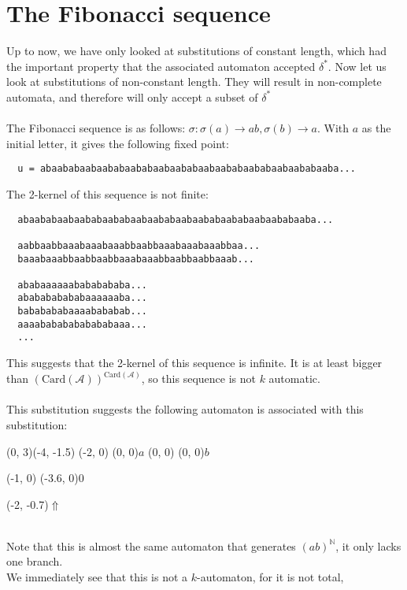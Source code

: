 \documentclass{article}
\begin{document}
\section*{The Fibonacci sequence}
Up to now, we have only looked at substitutions of constant length, which had
the important property that the associated automaton accepted 
$\delta^*$. Now let us look at substitutions of non-constant
length. They will result in non-complete automata, and therefore will only
accept a subset of $\delta^*$\\
\\
The Fibonacci sequence is as follows: $\sigma: \sigma(a) \rightarrow ab, 
\sigma(b) \rightarrow a$. With $a$ as the initial letter, it gives the 
following fixed point:
\begin{verbatim}
  u = abaababaabaababaababaabaababaabaababaababaabaababaaba...
\end{verbatim}
The 2-kernel of this sequence is not finite:
\begin{verbatim}
  abaababaabaababaababaabaababaabaababaababaabaababaaba...

  aabbaabbaaabaaabaaabbaabbaaabaaabaaabbaa...
  baaabaaabbaabbaabbaaabaaabbaabbaabbaaab...

  ababaaaaaabababababa...
  ababababababaaaaaaba...
  bababababaaaabababab...
  aaaabababababababaaa...
  ...
\end{verbatim}
This suggests that the 2-kernel of this sequence is infinite. It is at least
bigger than $(\mathrm{Card}(\mathcal{A}))^{\mathrm{Card}(\mathcal{A})}$, so
this sequence is not $k$ automatic.\\
\\
This substitution suggests the following automaton is associated with this 
substitution:\\
\begin{graph}(0, 3)(-4, -1.5)
  (-2, 0) (0, 0){$a$}
  (0, 0)  (0, 0){$b$}

  (-1, 0) \freetext(-3.6, 0){0}
   
   

  \freetext(-2, -0.7){$\Uparrow$}
\end{graph}\\
Note that this is almost the same automaton that generates
$(ab)^{\mathbb{N}}$, it only lacks one branch.\\
We immediately see that this is not a $k$-automaton, for it is not total,
\end{document}
